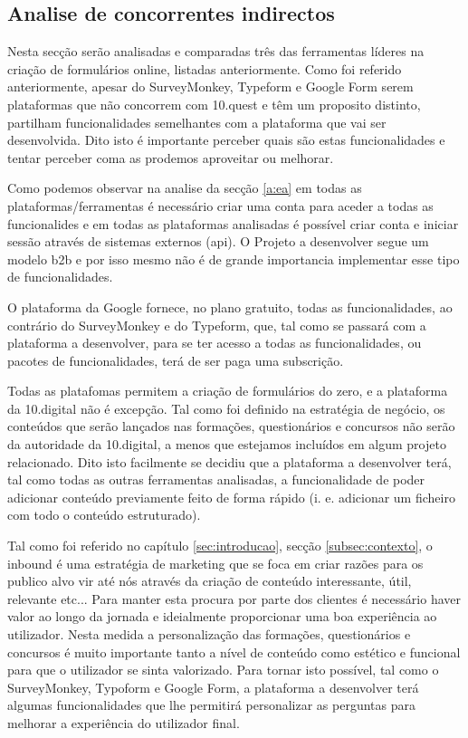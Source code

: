 \subsection{Analise de concorrentes indirectos}

Nesta secção serão analisadas e comparadas três das ferramentas líderes na criação de formulários online, listadas anteriormente. Como foi referido anteriormente, apesar do SurveyMonkey, Typeform e Google Form serem plataformas que não concorrem com 10.quest e têm um proposito distinto, partilham funcionalidades semelhantes com a plataforma que vai ser desenvolvida. Dito isto é importante perceber quais são estas funcionalidades e tentar perceber coma as prodemos aproveitar ou melhorar.

Como podemos observar na analise da secção \ref{a:ea} em todas as plataformas/ferramentas é necessário criar uma conta para aceder a todas as funcionalides e em todas as plataformas analisadas é possível criar conta e iniciar sessão através de sistemas externos (\acrshort{api}). O Projeto a desenvolver segue um modelo \gls{b2b} e por isso mesmo não é de grande importancia implementar esse tipo de funcionalidades.

O plataforma da Google fornece, no plano gratuito, todas as funcionalidades, ao contrário do SurveyMonkey e do Typeform, que, tal como se passará com a plataforma a desenvolver, para se ter acesso a todas as funcionalidades, ou pacotes de funcionalidades, terá de ser paga uma subscrição.

Todas as platafomas permitem a criação de formulários do zero, e a plataforma da 10.digital não é excepção. Tal como foi definido na estratégia de negócio, os conteúdos que serão lançados nas formações, questionários e concursos não serão da autoridade da 10.digital, a menos que estejamos incluídos em algum projeto relacionado. Dito isto facilmente se decidiu que a plataforma a desenvolver terá, tal como todas as outras ferramentas analisadas, a funcionalidade de poder adicionar conteúdo previamente feito de forma rápido (i. e. adicionar um ficheiro com todo o conteúdo estruturado). 


Tal como foi referido no capítulo \ref{sec:introducao}, secção \ref{subsec:contexto}, o inbound é uma estratégia de marketing que se foca em criar razões para os publico alvo vir até nós através da criação de conteúdo interessante, útil, relevante etc... Para manter esta procura por parte dos clientes é necessário haver valor ao longo da jornada e ideialmente proporcionar uma boa experiência ao utilizador. Nesta medida a personalização das formações, questionários e concursos é muito importante tanto a nível de conteúdo como estético e funcional para que o utilizador se sinta valorizado. Para tornar isto possível, tal como o SurveyMonkey, Typoform e Google Form, a plataforma a desenvolver terá algumas funcionalidades que lhe permitirá personalizar as perguntas para melhorar a experiência do utilizador final. 

